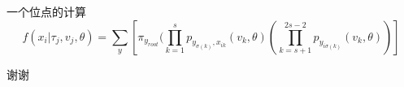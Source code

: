 \documentclass{beamer}
\begin{document}
\begin{frame}{一个位点的计算}
$$f(x_i|\tau_j,v_j,\theta)=\sum_y[\pi_{y_{root}}(\prod_{k=1}^{s}p_{y_{\sigma(k)},x_{ik}}(v_k,\theta)(\prod_{k=s+1}^{2s-2}p_{y_{i\sigma(k)}}(v_k,\theta))]$$
\end{frame}
\begin{frame}
\Huge {谢谢}
\end{frame}
\end{document}
